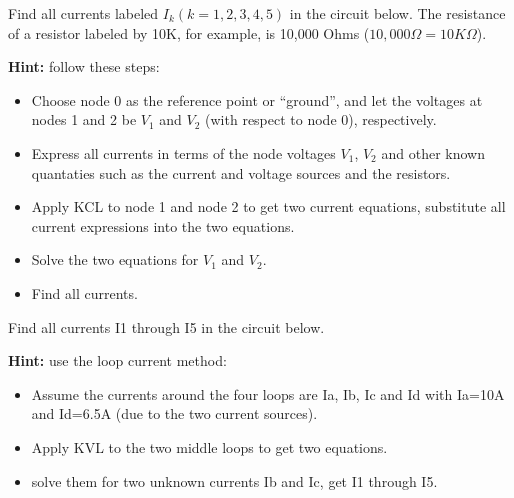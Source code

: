 
\item Find all currents labeled $I_k (k=1,2,3,4,5)$ in the circuit below. 
The resistance of a resistor labeled by 10K, for example, is 10,000
Ohms ($10,000 \Omega=10K\Omega$).

{\bf Hint:} follow these steps:
\begin{itemize}
\item Choose node 0 as the reference point or ``ground'', and let the 
	voltages at nodes 1 and 2 be $V_1$ and $V_2$ (with respect to
	node 0), respectively. 
\item Express all currents in terms of the node voltages $V_1$, $V_2$
	and other known quantaties such as the current and voltage sources
	and the resistors.
\item Apply KCL to node 1 and node 2 to get two current equations, 
	substitute all current expressions into the two equations.
\item Solve the two equations for $V_1$ and $V_2$.
\item Find all currents.
\end{itemize}



\item Find all currents I1 through I5 in the circuit below. 

{\bf Hint:} use the loop current method: 

\begin{itemize}
\item Assume the currents around the four loops are Ia, Ib, Ic and Id 
  with Ia=10A and Id=6.5A (due to the two current sources).
\item Apply KVL to the two middle loops to get two equations.
\item solve them for two unknown currents Ib and Ic, get I1 through I5.
\end{itemize}




